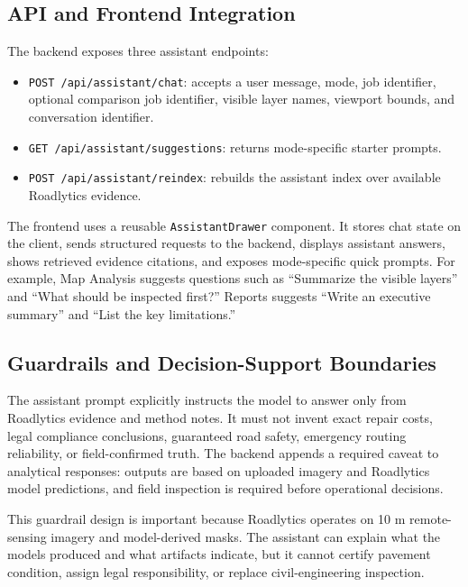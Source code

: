 ﻿\documentclass[conference]{IEEEtran}
\begin{document}
\subsection{API and Frontend Integration}
The backend exposes three assistant endpoints:
\begin{itemize}
\item \texttt{POST /api/assistant/chat}: accepts a user message, mode, job identifier, optional comparison job identifier, visible layer names, viewport bounds, and conversation identifier.
\item \texttt{GET /api/assistant/suggestions}: returns mode-specific starter prompts.
\item \texttt{POST /api/assistant/reindex}: rebuilds the assistant index over available Roadlytics evidence.
\end{itemize}

The frontend uses a reusable \texttt{AssistantDrawer} component. It stores chat state on the client, sends structured requests to the backend, displays assistant answers, shows retrieved evidence citations, and exposes mode-specific quick prompts. For example, Map Analysis suggests questions such as ``Summarize the visible layers'' and ``What should be inspected first?'' Reports suggests ``Write an executive summary'' and ``List the key limitations.''

\subsection{Guardrails and Decision-Support Boundaries}
The assistant prompt explicitly instructs the model to answer only from Roadlytics evidence and method notes. It must not invent exact repair costs, legal compliance conclusions, guaranteed road safety, emergency routing reliability, or field-confirmed truth. The backend appends a required caveat to analytical responses: outputs are based on uploaded imagery and Roadlytics model predictions, and field inspection is required before operational decisions.

This guardrail design is important because Roadlytics operates on 10 m remote-sensing imagery and model-derived masks. The assistant can explain what the models produced and what artifacts indicate, but it cannot certify pavement condition, assign legal responsibility, or replace civil-engineering inspection.
\end{document}
